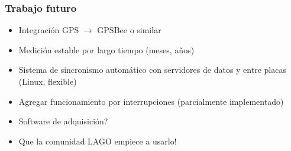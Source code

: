 \documentclass{beamer}
\begin{document}
\begin{frame}
	\frametitle{Trabajo futuro}
		\begin{exampleblock}{}
			\begin{itemize}
				\item Integración GPS $\to$ GPSBee o similar 
				\item Medición estable por largo tiempo (meses, años)
				\item Sistema de sincronismo automático con servidores de datos y entre
								placas (Linux, flexible)
				\item Agregar funcionamiento por interrupciones (parcialmente
								implementado)
				\item Software de adquisición?
				\item \alert{Que la comunidad LAGO empiece a usarlo!}
			\end{itemize}
		\end{exampleblock}
\end{frame}
\end{document}
